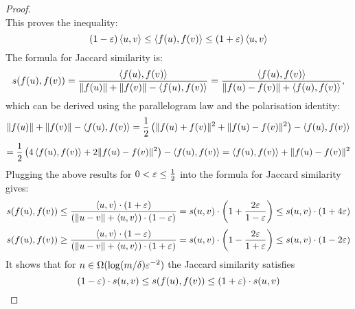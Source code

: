 \begin{proof}
\[\]
This proves the inequality:
\[
    (1-\varepsilon) \left\langle u,v \right\rangle \leq \left\langle f(u), f(v) \right\rangle \leq (1+\varepsilon)\left\langle u,v \right\rangle
\]
The formula for Jaccard similarity is:
\[
    s(f(u), f(v)) = \frac{\left\langle f(u), f(v) \right\rangle}{\| f(u) \| + \| f(v) \| - \left\langle f(u), f(v) \right\rangle} = \frac{\left\langle f(u), f(v) \right\rangle}{\| f(u)-f(v) \| + \left\langle f(u), f(v) \right\rangle},
\]
which can be derived using the parallelogram law and the polarisation identity:
\[
    \| f(u) \| + \| f(v) \| - \left\langle f(u), f(v) \right\rangle = \frac{1}{2} \left( \| f(u) + f(v) \|^2 + \| f(u) - f(v) \|^2 \right) - \left\langle f(u), f(v) \right\rangle
\]
\[
    = \frac{1}{2} \left( 4\left\langle f(u), f(v) \right\rangle + 2\| f(u) - f(v) \|^2 \right) - \left\langle f(u), f(v) \right\rangle = \left\langle f(u), f(v) \right\rangle + \| f(u) - f(v) \|^2
\]
Plugging the above results for \( 0 < \varepsilon \leq \frac{1}{2} \) into the formula for Jaccard similarity gives:
\[
    s(f(u), f(v)) \leq \frac{\left\langle u, v \right\rangle \cdot (1+\varepsilon)}{\left( \| u-v \| + \left\langle u, v \right\rangle \right) \cdot (1-\varepsilon)} = s(u, v) \cdot \left( 1 + \frac{2\varepsilon}{1-\varepsilon} \right) \leq s(u, v) \cdot (1 + 4\varepsilon)
\]
\[
    s(f(u), f(v)) \geq \frac{\left\langle u, v \right\rangle \cdot (1-\varepsilon)}{\left( \| u-v \| + \left\langle u, v \right\rangle \right) \cdot (1+\varepsilon)} = s(u, v) \cdot \left( 1 - \frac{2\varepsilon}{1+\varepsilon} \right) \leq s(u, v) \cdot (1 - 2\varepsilon)
\]
It shows that for \( n \in \Omega(\log(m/\delta)\varepsilon^{-2}) \) the Jaccard similarity satisfies
\[
    (1-\varepsilon) \cdot s(u,v) \leq s(f(u), f(v)) \leq (1+\varepsilon) \cdot s(u,v)
\]
\end{proof}